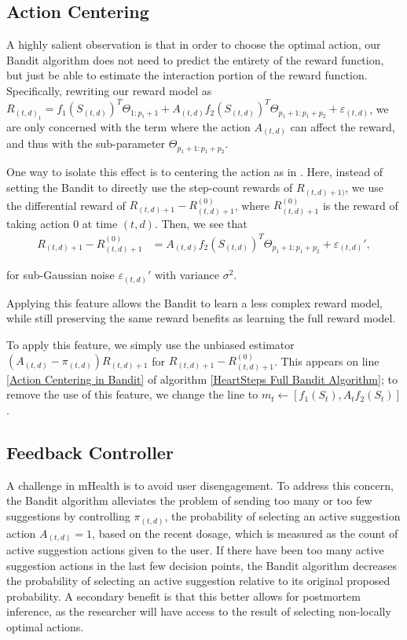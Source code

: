 \subsection{Action Centering}

A highly salient observation is that in order to choose the optimal action, our Bandit algorithm does not need to predict the entirety of the reward function, but just be able to estimate the interaction portion of the reward function.  Specifically, rewriting our reward model as $R_{(t,d)_1} = f_1(S_{(t,d)})^T \Theta_{1:p_1 + 1} + A_{(t,d)} f_2(S_{(t,d)})^T \Theta_{p_1+1 : p_1+p_2} + \varepsilon_{(t,d)}$, we are only concerned with the term where the action $A_{(t,d)}$ can affect the reward, and thus with the sub-parameter $\Theta_{p_1+1 : p_1+p_2}$.

One way to isolate this effect is to centering the action as in \citet{Greenewald2017}.  Here, instead of setting the Bandit to directly use the step-count rewards of $R_{(t,d)+1)}$, we use the differential reward of $R_{(t,d)+1} - R_{(t,d)+1}^{(0)}$, where $R_{(t,d)+1}^{(0)}$ is the reward of taking action $0$ at time $(t,d)$.  Then, we see that
\begin{align}
	R_{(t,d)+1} - R_{(t,d)+1}^{(0)} &= A_{(t,d)} f_2(S_{(t,d)})^T \Theta_{p_1+1 : p_1+p_2} + \varepsilon_{(t,d)}',
\end{align}

for sub-Gaussian noise $\varepsilon_{(t,d)}'$ with variance $\sigma^2$.


Applying this feature allows the Bandit to learn a less complex reward model, while still preserving the same reward benefits as learning the full reward model.

To apply this feature, we simply use the unbiased estimator $(A_{(t,d)} - \pi_{(t,d)}) R_{(t,d)+1}$ for $R_{(t,d)+1} - R_{(t,d)+1}^{(0)}$.  This appears on line \ref{Action Centering in Bandit} of algorithm \ref{HeartSteps Full Bandit Algorithm}; to remove the use of this feature, we change the line to $m_t \leftarrow [f_1(S_t), A_t f_2(S_t)]$.


\subsection{Feedback Controller}

A challenge in mHealth is to avoid user disengagement.  To address this concern, the Bandit algorithm alleviates the problem of sending too many or too few suggestions by controlling $\pi_{(t,d)}$, the probability of selecting an active suggestion action $A_{(t,d)} = 1$, based on the recent dosage, which is measured as the count of active suggestion actions given to the user.  If there have been too many active suggestion actions in the last few decision points, the Bandit algorithm decreases the probability of selecting an active suggestion relative to its original proposed probability.  A secondary benefit is that this better allows for postmortem inference, as the researcher will have access to the result of selecting non-locally optimal actions.

